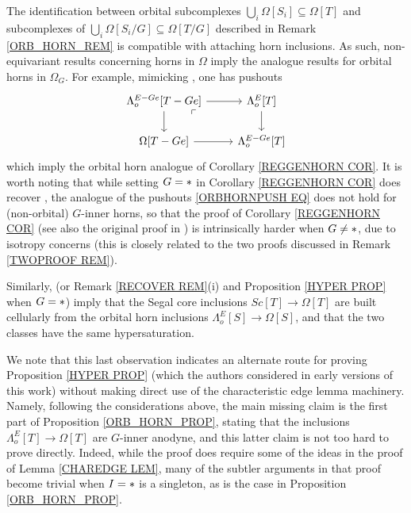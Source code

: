 \documentclass[a4paper,10pt
 ,draft
]{article}%
\begin{document}
\begin{remark}
      \label{ORBHYPER_REM}
	The identification between orbital subcomplexes 
	$\bigcup_i \Omega[S_i] \subseteq \Omega[T]$ and subcomplexes of 
	$\bigcup_i \Omega[S_i/G] \subseteq \Omega[T/G]$
	described in Remark \ref{ORB_HORN_REM}
	is compatible with attaching horn inclusions.
	As such, non-equivariant results concerning horns in $\Omega$
	imply the analogue results for orbital horns in $\Omega_G$. For example, mimicking \cite[Lemma 5.1]{MW09}, one has pushouts	
\begin{equation}\label{ORBHORNPUSH EQ}
\begin{tikzcd}
	\Lambda^{E - G e}_o[T - Ge] \arrow[r] \arrow[d]
	\arrow[dr, phantom, "\ulcorner", very near start] &
	\Lambda^{E}_o[T] \arrow[d]
\\
	\Omega[T - G e] \arrow[r]&
	\Lambda^{E - G e}_o[T]
\end{tikzcd}
\end{equation}	
which imply the orbital horn analogue of 
Corollary \ref{REGGENHORN COR}.
It is worth noting that while setting $G=\**$ in 
Corollary \ref{REGGENHORN COR} does recover
\cite[Lemma 5.1]{MW09}, 
the analogue of the pushouts \eqref{ORBHORNPUSH EQ}
does not hold for (non-orbital) $G$-inner horns,
so that the proof of Corollary \ref{REGGENHORN COR}
(see also the original proof in \cite[Prop. 6.17]{Per18})
is intrinsically harder when $G \neq \**$,
due to isotropy concerns (this is closely related to the two proofs discussed in Remark \ref{TWOPROOF REM}).

Similarly, \cite[Props. 2.4 and 2.5]{CM13a} 
(or Remark \ref{RECOVER REM}(i) and Proposition \ref{HYPER PROP} when $G=\**$)
imply that the Segal core inclusions 
$Sc[T] \to \Omega[T]$
are built cellularly from the orbital horn inclusions
$\Lambda^E_o[S] \to \Omega[S]$, and that the two classes have the same hypersaturation. 

	We note that this last observation indicates an alternate route for proving Proposition \ref{HYPER PROP}
	(which the authors considered in early versions of this work)
	without making direct use of the characteristic edge lemma machinery.
	Namely, following the considerations above, the main missing claim is the first part of Proposition \ref{ORB_HORN_PROP}, stating that the inclusions
	$\Lambda^E_o[T] \to \Omega[T]$ are $G$-inner anodyne, and this latter claim is not too hard to prove directly. 
	Indeed, while the proof does require some of the ideas in the proof of Lemma \ref{CHAREDGE LEM},
	many of the subtler arguments in that proof
	become trivial when $I=\**$ is a singleton, as is the case in Proposition \ref{ORB_HORN_PROP}.
\end{remark}
\end{document}
